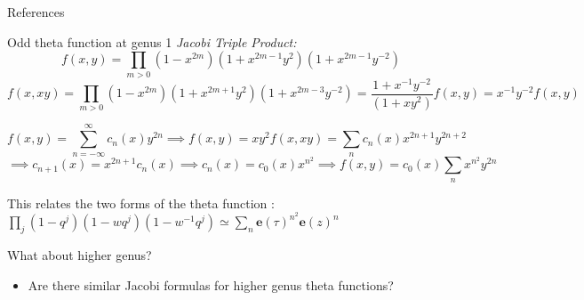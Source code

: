 \documentclass[11pt,aspectratio=169]{beamer}
\newcommand{\ee}[0]{\mathbf{e}}
\begin{document}
\begin{frame}{References}
    \printbibliography{}
\end{frame}

\begin{frame}[noframenumbering]{Odd theta function at genus 1}
    \emph{Jacobi Triple Product:}
    \[f(x,y) = \prod_{m>0} (1-x^{2m})(1+x^{2m-1}y^2)(1+x^{2m-1}y^{-2})\]
    \[f(x,xy) = \prod_{m>0} (1-x^{2m})(1+x^{2m+1}y^2)(1+x^{2m-3}y^{-2}) = \frac{1+x^{-1}y^{-2}}{(1+xy^2)}f(x,y) = x^{-1}y^{-2}f(x,y)\]

    \[f(x,y) = \sum_{n=-\infty}^\infty c_n(x) y^{2n} \implies f(x,y) = xy^2 f(x,xy) = \sum_n c_n(x) x^{2n+1}y^{2n+2}\]
    \[\implies c_{n+1}(x) = x^{2n+1}c_n(x) \implies c_{n}(x) = c_0(x) x^{n^2} \implies f(x,y) = c_0(x) \sum_n x^{n^2} y^{2n}\]

    This relates the two forms of the theta function : $\prod_j (1-q^j) (1-wq^j)(1-w^{-1}q^j) \simeq \sum_n \ee(\tau)^{n^2} \ee(z)^{n}$

    {
        \begin{block}{What about higher genus?}
            \begin{itemize}
                \item Are there similar Jacobi formulas for higher genus theta functions?
            \end{itemize}
        \end{block}
    }
\end{frame}
\end{document}
